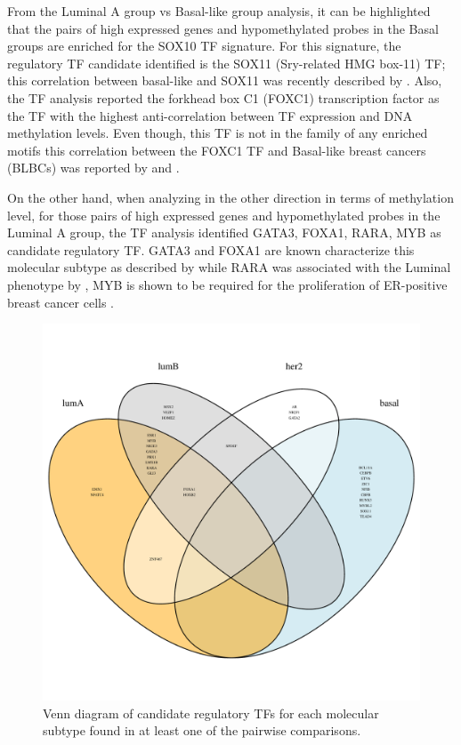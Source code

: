 From the  Luminal A group vs Basal-like group analysis, it can be highlighted that the pairs of
high expressed genes and hypomethylated probes in the Basal groups are enriched for the SOX10 TF signature.
For this signature, the regulatory TF candidate identified is the SOX11 (Sry-related HMG box-11) TF; this
correlation between basal-like and SOX11 was recently described by .
Also, the TF analysis  reported the forkhead box C1 (FOXC1) transcription factor as the TF with the
highest anti-correlation between TF expression and DNA methylation levels. Even though,
this TF is not in the family of any enriched motifs this correlation between the FOXC1 TF and Basal-like
breast cancers (BLBCs) was reported by  and .

On the other hand, when analyzing in the other direction in terms of methylation level, for  those pairs of high expressed genes and hypomethylated probes in the Luminal A group, the TF analysis identified GATA3, FOXA1, RARA, MYB as candidate regulatory TF. GATA3 and FOXA1 are known characterize this  molecular subtype  as described by  while RARA was associated with the Luminal phenotype by , MYB
is shown to be required for the proliferation of ER-positive breast cancer cells \cite{mitra2016cdk9}.

\begin{figure}[ht!]
\centering
\includegraphics[width=1.0\textwidth]{images/BRCA_ven.pdf}
\caption{\label{fig:venn} Venn diagram of candidate regulatory TFs for each molecular subtype found in at least one of the pairwise comparisons.}
\end{figure}

